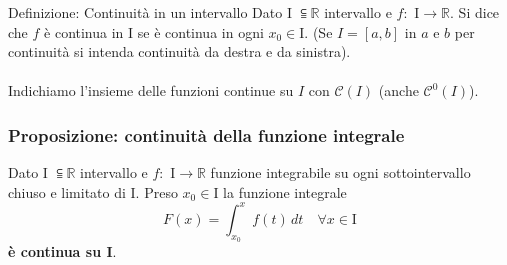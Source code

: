 \documentclass[x11names]{article}
\begin{document}
		\begin{center}
		\colorbox{myblue}{\begin{minipage}{5.75in}
				\begin{blues}{Definizione: Continuità in un intervallo}
					Dato I $\subseteqq \mathbb{R}$ intervallo e $f:$ I$\to \mathbb{R}$. Si dice che $f$ è continua in I se è continua in ogni $x_0 \in \text{I}$. (Se $I = [a,b]$ in $a$ e $b$ per continuità si intenda continuità da destra e da sinistra). \\ \\
					Indichiamo l'insieme delle funzioni continue su $I$ con $\mathcal{C}\left(I\right)$ (anche $\mathcal{C}^0\left(I\right)$).
				\end{blues}
		\end{minipage}}       
	\end{center}
	\begin{center}
		\colorbox{myred}{\begin{minipage}{5.75in}
				\begin{redes}{}
					\subsubsection{Proposizione: continuità della funzione integrale}
					Dato I $\subseteqq \mathbb{R}$ intervallo e $f:$ I$\to \mathbb{R}$ funzione integrabile su ogni sottointervallo chiuso e limitato di I. Preso $x_0 \in \text{I}$ la funzione integrale
					\[
					F(x) = \int_{x_0}^{x}f(t) \,dt \quad \forall x \in \text{I}
					\]
					\textbf{è continua su I}.
				\end{redes}
		\end{minipage}}        
	\end{center}
\end{document}
